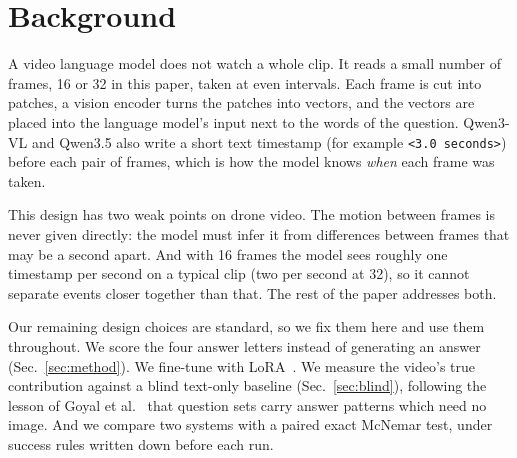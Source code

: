 \section{Background}
\label{sec:background}

A video language model does not watch a whole clip. It reads a small number
of frames, 16 or 32 in this paper, taken at even intervals. Each frame is cut into patches,
a vision encoder turns the patches into vectors, and the vectors are placed
into the language model's input next to the words of the question.
Qwen3-VL and Qwen3.5 also write a short text timestamp (for example
\texttt{<3.0 seconds>}) before each pair of frames, which is how the model
knows \emph{when} each frame was taken.

This design has two weak points on drone video. The motion between frames is
never given directly: the model must infer it from differences between frames
that may be a second apart. And with 16 frames the model sees roughly one
timestamp per second on a typical clip (two per second at 32), so it cannot separate events closer together than
that. The rest of the paper addresses both.

Our remaining design choices are standard, so we fix them here and use them
throughout. We score the four answer letters instead of generating an
answer (Sec.~\ref{sec:method}). We fine-tune with
LoRA~\cite{hu2022lora}. We measure the video's true contribution against a
blind text-only baseline (Sec.~\ref{sec:blind}), following the lesson of
Goyal et al.~\cite{goyal2017vqav2} that question sets carry answer patterns
which need no image. And we compare two systems with a paired exact McNemar
test, under success rules written down before each run.
